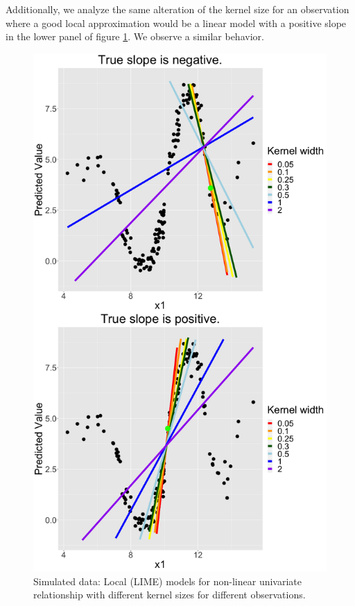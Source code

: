 \documentclass[]{krantz}
\begin{document}
Additionally, we analyze the same alteration of the kernel size for an
observation where a good local approximation would be a linear model
with a positive slope in the lower panel of figure \ref{fig:lime-fig6}.
We observe a similar behavior.

\begin{figure}

{\centering \includegraphics[width=0.99\linewidth]{images/04-09-06} 

}

\caption{Simulated data: Local (LIME) models for non-linear univariate relationship with different kernel sizes for different observations.}\label{fig:lime-fig6}
\end{figure}
\end{document}
